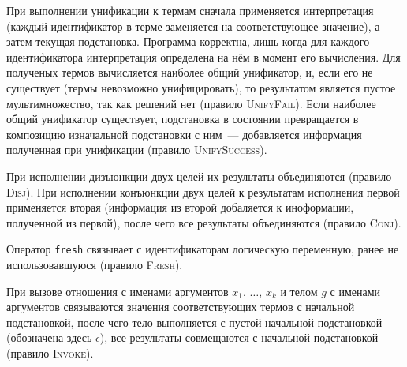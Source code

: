     
    При выполнении унификации к термам сначала применяется интерпретация (каждый идентификатор в терме заменяется на соответствующее значение), а затем текущая подстановка. Программа корректна, лишь когда для каждого идентификатора интерпретация определена на нём в момент его вычисления. Для полученых термов вычисляется наиболее общий унификатор, и, если его не существует (термы невозможно унифицировать), то результатом является пустое мультимножество, так как решений нет (правило \textsc{UnifyFail}). Если наиболее общий унификатор существует, подстановка в состоянии превращается в композицию изначальной подстановки с ним~--- добавляется информация полученная при унификации (правило \textsc{UnifySuccess}).
    
    При исполнении дизъюнкции двух целей их результаты объединяются (правило \textsc{Disj}). При исполнении конъюнкции двух целей к результатам исполнения первой применяется вторая (информация из второй добаляется к иноформации, полученной из первой), после чего все результаты объединяются (правило \textsc{Conj}).
    
                 
    Оператор \lstinline|fresh| связывает с идентификаторам логическую переменную, ранее не использовавшуюся (правило \textsc{Fresh}).
    

    При вызове отношения с именами аргументов $x_1$, $\dots$, $x_k$ и телом $g$ с именами аргументов связываются значения соответствующих термов с начальной подстановкой, после чего тело выполняется с пустой начальной подстановкой (обозначена здесь $\epsilon$), все результаты совмещаются с начальной подстановкой (правило \textsc{Invoke}).
    
